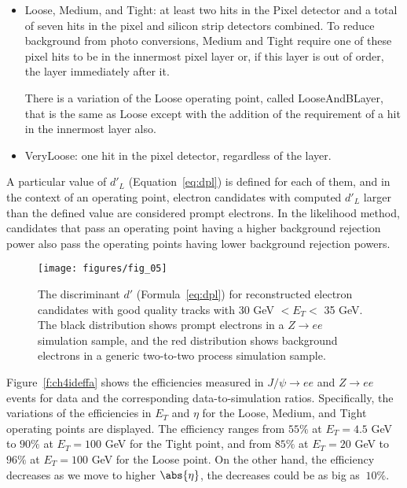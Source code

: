 \begin{itemize}

	\item Loose, Medium, and Tight: at least two hits in the Pixel detector and a
	      total of seven hits in the pixel and silicon strip detectors combined. To
	      reduce background from photo conversions, Medium and Tight require one of these
	      pixel hits to be in the innermost pixel layer or, if this layer is out of
	      order, the layer immediately after it.

	      There is a variation of the Loose operating point, called LooseAndBLayer, that
	      is the same as Loose except with the addition of the requirement of a hit in
	      the innermost layer also.

	\item  VeryLoose: one hit in the pixel detector, regardless of the layer.
\end{itemize}


A particular value of $d'_L$ (Equation~\ref{eq:dpl}) is defined for each of
them, and in the context of an operating point, electron candidates with
computed $d'_L$ larger than the defined value are considered prompt electrons.
In the likelihood method, candidates that pass an operating point having a
higher background rejection power also pass the operating points having lower
background rejection powers.

\begin{figure}[H]
	\texttt{[image: figures/fig\_05]}
	\centering

	\caption{The discriminant $d'$ (Formula~\ref{eq:dpl}) for reconstructed
		electron candidates with good quality tracks with 30 GeV $< E_T <$ 35 GeV. The
		black distribution shows prompt electrons in a $Z\to ee$ simulation sample,
		and the red distribution shows background electrons in a generic two-to-two
		process simulation sample.}

	\label{f:elcidllhd}

\end{figure}

Figure~\ref{f:ch4ideffa} shows the efficiencies measured in $J/\psi \to ee$ and
$Z\to ee$ events for data and the corresponding data-to-simulation ratios.
Specifically, the variations of the efficiencies in $E_T$ and $\eta$ for the
Loose, Medium, and Tight operating points are displayed. The efficiency ranges
from $55\%$ at $E_T= 4.5$ GeV to $90\%$ at $E_T=100$ GeV for the Tight point,
and from $85\%$ at $E_T = 20$ GeV to $96\%$ at $E_T = 100$ GeV for the Loose
point. On the other hand, the efficiency decreases as we move to higher
$\abs{\eta}$, the decreases could be as big as $~ 10\%$.

